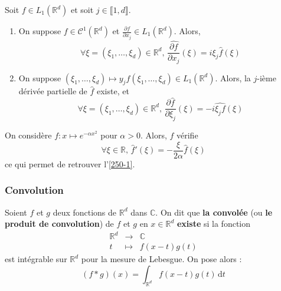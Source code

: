 
  \begin{proposition}
    Soit $f \in L_1(\mathbb{R}^d)$ et soit $j \in \llbracket 1, d \rrbracket$.
    \begin{enumerate}[label={\bfseries(\roman*)}]
      \item On suppose $f \in \mathcal{C}^1(\mathbb{R}^d)$ et $\frac{\partial f}{\partial x_j} \in L_1(\mathbb{R}^d)$. Alors,
      \[ \forall \xi = (\xi_1, \dots, \xi_d) \in \mathbb{R}^d, \, \widehat{\frac{\partial f}{\partial x_j}}(\xi) = i \xi_j \widehat{f}(\xi) \]
      \item On suppose $(\xi_1, \dots, \xi_d) \mapsto y_j f(\xi_1, \dots, \xi_d) \in L_1(\mathbb{R}^d)$. Alors, la $j$-ième dérivée partielle de $\widehat{f}$ existe, et
      \[ \forall \xi = (\xi_1, \dots, \xi_d) \in \mathbb{R}^d, \, \frac{\partial \widehat{f}}{\partial \xi_j}(\xi) = -i \widehat{\xi_j f}(\xi) \]
    \end{enumerate}
  \end{proposition}


  \begin{application}
    On considère $f : x \mapsto e^{- \alpha x^2}$ pour $\alpha > 0$. Alors, $f$ vérifie
    \[ \forall \xi \in \mathbb{R}, \, \widehat{f}'(\xi) = -\frac{\xi}{2\alpha}\widehat{f}(\xi) \]
    ce qui permet de retrouver l'\cref{250-1}.
  \end{application}

  \subsubsection{Convolution}


  \begin{definition}
    Soient $f$ et $g$ deux fonctions de $\mathbb{R}^d$ dans $\mathbb{C}$. On dit que \textbf{la convolée} (ou \textbf{le produit de convolution}) de $f$ et $g$ en $x \in \mathbb{R}^d$ \textbf{existe} si la fonction
    \[
    \begin{array}{ccc}
      \mathbb{R}^d &\rightarrow& \mathbb{C} \\
      t &\mapsto& f(x-t)g(t)
    \end{array}
    \]
    est intégrable sur $\mathbb{R}^d$ pour la mesure de Lebesgue. On pose alors :
    \[ (f * g)(x) = \int_{\mathbb{R}^d} f(x-t)g(t) \, \mathrm{d}t \]
  \end{definition}

